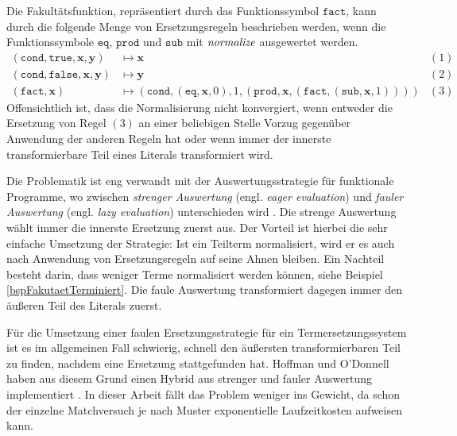 \begin{beispiel} \label{bspFakutaetTerminiert}
Die Fakultätsfunktion, repräsentiert durch das Funktionssymbol $\texttt{fact}$, kann durch die folgende Menge von Ersetzungsregeln beschrieben werden, wenn die Funktionssymbole $\texttt{eq}$, $\texttt{prod}$ und $\texttt{sub}$ mit $\mathit{normalize}$ ausgewertet werden. 
\begin{align*}
    (\texttt{cond}, \texttt{true}, \mathbf x, \mathbf y) 
    &\mapsto \mathbf x 
    &(1)\\        
    (\texttt{cond}, \texttt{false}, \mathbf x, \mathbf y) 
    &\mapsto \mathbf y 
    &(2)\\        
    (\texttt{fact}, \mathbf x) 
    &\mapsto (\texttt{cond}, (\texttt{eq}, \mathbf x, 0), 1, (\texttt{prod}, \mathbf x, (\texttt{fact}, (\texttt{sub}, \mathbf x, 1)))) 
    &(3)
\end{align*}
Offensichtlich ist, dass die Normalisierung nicht konvergiert, wenn entweder die Ersetzung von Regel $(3)$ an einer beliebigen Stelle Vorzug gegenüber Anwendung der anderen Regeln hat oder wenn immer der innerste transformierbare Teil eines Literals transformiert wird.
\end{beispiel}

Die Problematik ist eng verwandt mit der Auswertungsstrategie für funktionale Programme, wo zwischen \textit{strenger Auswertung} (engl. \textit{eager evaluation}) und \textit{fauler Auswertung} (engl. \textit{lazy evaluation}) unterschieden wird  \cite{EvalStrategien}. Die strenge Auswertung wählt immer die innerste Ersetzung zuerst aus. Der Vorteil ist hierbei die sehr einfache Umsetzung der Strategie: Ist ein Teilterm normalisiert, wird er es auch nach Anwendung von Ersetzungsregeln auf seine Ahnen bleiben. Ein Nachteil besteht darin, dass weniger Terme normalisiert werden können, siehe Beispiel \ref{bspFakutaetTerminiert}. Die faule Auswertung transformiert dagegen immer den äußeren Teil des Literals zuerst. 

Für die Umsetzung einer faulen Ersetzungsstrategie für ein Termersetzungssystem ist es im allgemeinen Fall schwierig, schnell den äußersten transformierbaren Teil zu finden, nachdem eine Ersetzung stattgefunden hat. Hoffman und O'Donnell haben aus diesem Grund einen Hybrid aus strenger und fauler Auswertung implementiert \cite{hoffmann1982programming}.
 In dieser Arbeit fällt das Problem weniger ins Gewicht, da schon der einzelne Matchversuch je nach Muster exponentielle Laufzeitkosten aufweisen kann.








